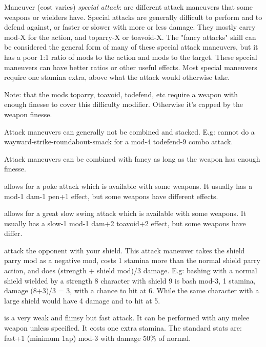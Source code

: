 Maneuver (cost varies) \emph{special attack}: are different attack maneuvers that some weapons or wielders have. Special attacks are generally difficult to perform and to defend against, or faster or slower with more or less damage. They mostly carry mod-X for the action, and toparry-X or toavoid-X. The "fancy attacks" skill can be considered the general form of many of these special attack maneuvers, but it has a poor 1:1 ratio of mods to the action and mods to the target. These special maneuvers can have better ratios or other useful effects. Most special maneuvers require one stamina extra, above what the attack would otherwise take.

Note: that the mods toparry, toavoid, todefend, etc require a weapon with enough finesse to cover this difficulty modifier. Otherwise it's capped by the weapon finesse.

Attack maneuvers can generally not be combined and stacked. E.g: cannot do a wayward-strike-roundabout-smack for a mod-4 todefend-9 combo attack.

Attack maneuvers can be combined with fancy as long as the weapon has enough finesse.


\openskillslist


 allows for a poke attack which is available with some weapons. It usually has a mod-1 dam-1 pen+1 effect, but some weapons have different effects.


 allows for a great slow swing attack which is available with some weapons. It usually has a slow-1 mod-1 dam+2 toavoid+2 effect, but some weapons have differ.


 attack the opponent with your shield. This attack maneuver takes the shield parry mod as a negative mod, costs 1 stamina more than the normal shield parry action, and does (strength + shield mod)/3 damage. E.g: bashing with a normal shield wielded by a strength 8 character with shield 9 is bash mod-3, 1 stamina, damage (8+3)/3 = 3, with a chance to hit at 6. While the same character with a large shield would have 4 damage and to hit at 5.


 is a very weak and flimsy but fast attack. It can be performed with any melee weapon unless specified. It costs one extra stamina. The standard stats are:\\
fast+1 (minimum 1ap) mod-3 with damage 50\% of normal.

\

